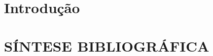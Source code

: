 \documentclass[12pt,oneside,a4paper,chapter=TITLE, english, french,	spanish, brazil]{abntex2-logatti}
\begin{document}


\tableofcontents*
\cleardoublepage



\textual

\chapter*[Introdução]{Introdução}

\cleardoublepage
\chapter{SÍNTESE BIBLIOGRÁFICA}

% 







\postextual

\end{document}
